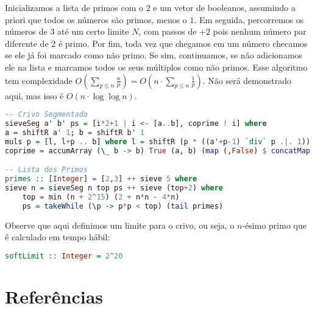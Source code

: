 \documentclass{article}
\begin{document}
Inicializamos a lista de primos com o $2$ e um vetor de booleanos, assumindo a priori que todos os números são primos, menos o $1$. Em seguida, percorremos os números de $3$ até um certo limite $N$, com passos de $+2$ pois nenhum número par diferente de 2 é primo. Por fim, toda vez que chegamos em um número checamos se ele já foi marcado como não primo. Se sim, continuamos, se não adicionamos ele na lista e marcamos todos os seus múltiplos como não primos. Esse algoritmo tem complexidade $O(\sum_{p \leq n} \frac{n}{p}) = O(n \cdot \sum_{p \leq n}\frac{1}{p})$. Não será demonstrado aqui, mas isso é $O(n \cdot \log \log n)$.

\begin{minipage}{0.9\linewidth}
\begin{lstlisting}[language=haskell,caption=Crivo de Eratóstenes e Lista dos primos]
-- Crivo Segmentado
sieveSeg a' b' ps = [i*2+1 | i <- [a..b], coprime ! i] where
a = shiftR a' 1; b = shiftR b' 1
muls p = [l, l+p .. b] where l = shiftR (p * ((a'+p-1) `div` p .|. 1)) 1
coprime = accumArray (\_ b -> b) True (a, b) (map (,False) $ concatMap muls ps) :: UArray Integer Bool

-- Lista dos Primos
primes :: [Integer] = [2,3] ++ sieve 5 where
sieve n = sieveSeg n top ps ++ sieve (top+2) where
    top = min (n + 2^15) (2 + n*n - 4*n)
    ps = takeWhile (\p -> p*p < top) (tail primes)
\end{lstlisting}
\end{minipage}

Observe que aqui definimos um limite para o crivo, ou seja, o $n$-ésimo primo que é calculado em tempo hábil:

\begin{minipage}{0.9\linewidth}
\begin{lstlisting}[language=haskell,caption=Limite do Crivo]
softLimit :: Integer = 2^20
\end{lstlisting}
\end{minipage}

\section{Referências}

\printbibliography
\end{document}
